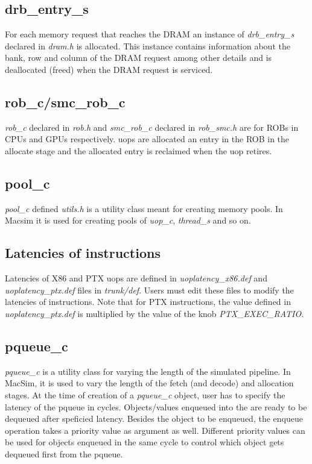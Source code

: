 \subsection{drb\_entry\_s}

For each memory request that reaches the DRAM an instance of
\textit{drb\_entry\_s} declared in \textit{dram.h} is allocated. This instance
contains information about the bank, row and column of the DRAM request among
other details and is deallocated (freed) when the DRAM request is serviced.


\subsection{rob\_c/smc\_rob\_c}

\textit{rob\_c} declared in \textit{rob.h} and \textit{smc\_rob\_c} declared in
\textit{rob\_smc.h} are for ROBs in CPUs and GPUs respectively. uops are
allocated an entry in the ROB in the allocate stage and the allocated entry is
reclaimed when the uop retires.

\subsection{pool\_c}

\textit{pool\_c} defined \textit{utils.h} is a utility class meant for creating
memory pools. In Macsim it is used for creating pools of \textit{uop\_c},
       \textit{thread\_s} and so on.


\subsection{Latencies of instructions}

Latencies of X86 and PTX uops are defined in \textit{uoplatency\_x86.def} and
\textit{uoplatency\_ptx.def} files in \textit{trunk/def}. Users must edit these
files to modify the latencies of instructions. Note that for PTX instructions,
      the value defined in \textit{uoplatency\_ptx.def} is multiplied by the
      value of the knob \textit{PTX\_EXEC\_RATIO}.


\subsection{pqueue\_c}

\textit{pqueue\_c} is a utility class for varying the length of the simulated
pipeline. In MacSim, it is used to vary the length of the fetch (and decode)
  and allocation stages. At the time of creation of a \textit{pqueue\_c}
  object, user has to specify the latency of the pqueue in cycles.
  Objects/values enqueued into the are ready to be dequeued after speficied
  latency. Besides the object to be enqueued, the enqueue operation takes a
  priority value as argument as well. Different priority values can be used for
  objects enqueued in the same cycle to control which object gets dequeued
  first from the pqueue.


